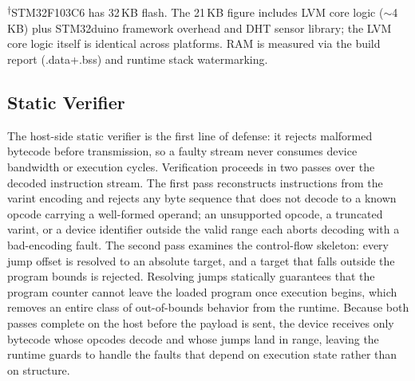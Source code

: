 \documentclass[a4paper,fleqn,longmktitle]{cas-dc}
\begin{document}
\begin{table}[t]
\centering
\caption{LVM resource footprint (measured on ESP8266 and STM32F103).}
\label{tab:footprint}
\footnotesize
{}\\[2pt]
{\footnotesize \textsuperscript{$\dagger$}STM32F103C6 has 32\,KB flash. The 21\,KB figure includes LVM core logic ($\sim$4\,KB) plus STM32duino framework overhead and DHT sensor library; the LVM core logic itself is identical across platforms. RAM is measured via the build report (.data+.bss) and runtime stack watermarking.}
\end{table}

\subsection{Static Verifier}
\label{sec:validator}

The host-side static verifier is the first line of defense: it rejects malformed bytecode before transmission, so a faulty stream never consumes device bandwidth or execution cycles. Verification proceeds in two passes over the decoded instruction stream. The first pass reconstructs instructions from the varint encoding and rejects any byte sequence that does not decode to a known opcode carrying a well-formed operand; an unsupported opcode, a truncated varint, or a device identifier outside the valid range each aborts decoding with a bad-encoding fault. The second pass examines the control-flow skeleton: every jump offset is resolved to an absolute target, and a target that falls outside the program bounds is rejected. Resolving jumps statically guarantees that the program counter cannot leave the loaded program once execution begins, which removes an entire class of out-of-bounds behavior from the runtime. Because both passes complete on the host before the payload is sent, the device receives only bytecode whose opcodes decode and whose jumps land in range, leaving the runtime guards to handle the faults that depend on execution state rather than on structure.
\end{document}
